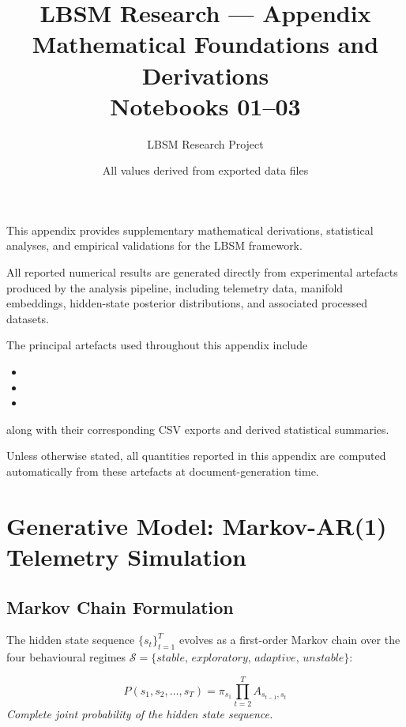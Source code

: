 \documentclass[12pt]{article}
\title{LBSM Research --- Appendix\\
  Mathematical Foundations and Derivations\\
  Notebooks 01--03}
\author{LBSM Research Project}
\date{All values derived from exported data files}
\begin{document}
\maketitle
\tableofcontents
\newpage

\appendix

\begin{tcolorbox}[
    colback=white,
    colframe=black,
    boxrule=0.5pt
]

This appendix provides supplementary mathematical derivations,
statistical analyses, and empirical validations for the LBSM framework.

All reported numerical results are generated directly from experimental
artefacts produced by the analysis pipeline, including telemetry data,
manifold embeddings, hidden-state posterior distributions, and
associated processed datasets.

The principal artefacts used throughout this appendix include

\begin{itemize}
    \item {}
    \item {}
    \item {}
\end{itemize}

along with their corresponding CSV exports and derived statistical
summaries.

Unless otherwise stated, all quantities reported in this appendix are
computed automatically from these artefacts at document-generation
time.

\end{tcolorbox}

\section{Generative Model: Markov-AR(1) Telemetry Simulation}

\subsection{Markov Chain Formulation}

The hidden state sequence $\{s_t\}_{t=1}^{T}$ evolves as a
first-order Markov chain over the four behavioural regimes
$\mathcal{S} = \{\textit{stable},\,\textit{exploratory},\,
\textit{adaptive},\,\textit{unstable}\}$:

\begin{equation}
P(s_1, s_2, \ldots, s_T) = \pi_{s_1}\prod_{t=2}^{T} A_{s_{t-1}, s_t}
\end{equation}
\noindent\textit{Complete joint probability of the hidden state sequence.}
\end{document}
